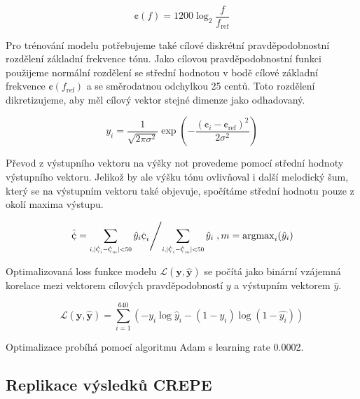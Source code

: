     $$\cent(f) = 1200 \log_2{\frac{f}{f_{\mathrm{ref}}}}$$

Pro trénování modelu potřebujeme také cílové diskrétní pravděpodobnostní rozdělení základní frekvence tónu. Jako cílovou pravděpodobnostní funkci použijeme normální rozdělení se střední hodnotou v bodě cílové základní frekvence $\cent(f_{\mathrm{ref}})$ a se směrodatnou odchylkou 25 centů. Toto rozdělení dikretizujeme, aby měl cílový vektor stejné dimenze jako odhadovaný.

    $$y_i = \frac{1}{\sqrt{2 \pi \sigma^2}}\exp{(-\frac{(\cent_i - \cent_{\mathrm{ref}})^2}{2 \sigma^2})}$$

Převod z výstupního vektoru na výšky not provedeme pomocí střední hodnoty výstupního vektoru. Jelikož by ale výšku tónu ovlivňoval i další melodický šum, který se na výstupním vektoru také objevuje, spočítáme střední hodnotu pouze z okolí maxima výstupu.

    $$ \left. \hat{\cent} = \sum_{\scaleto{i, \lvert \cent_i - \cent_m \rvert < 50}{8pt}} {\hat{y}_i \cent_i} \middle/ \sum_{\scaleto{i, \lvert \cent_i - \cent_m \rvert < 50}{8pt}} \hat{y}_i \right., m = \mathrm{argmax}_i(\hat{y}_i)$$

Optimalizovaná loss funkce modelu $\mathcal{L}(\mathbf{y}, \mathbf{\hat{y}})$ se počítá jako binární vzájemná korelace mezi vektorem cílových pravděpodobností $y$ a výstupním vektorem $\hat{y}$.

    $$\mathcal{L}(\mathbf{y}, \mathbf{\hat{y}}) = \sum_{i = 1}^{640}{(-y_i\log\hat{y}_i - (1-y_i)\log(1-\hat{y_i}))}$$

Optimalizace probíhá pomocí algoritmu Adam \citep{Kingma2014} s learning rate 0.0002.






\subsection{Replikace výsledků CREPE}


